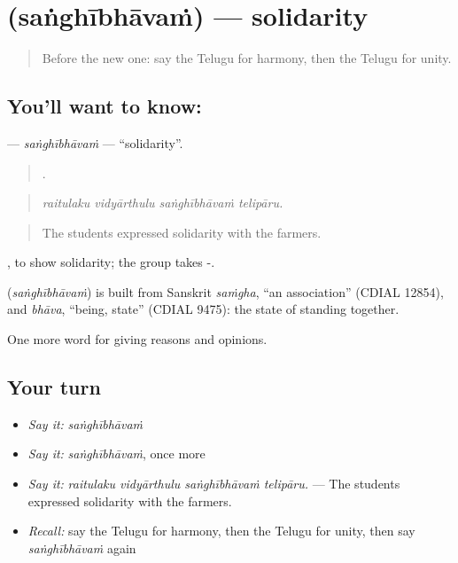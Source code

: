 \section[\texorpdfstring{\te{సంఘీభావం} (saṅghībhāvaṁ)}{సంఘీభావం (saṅghībhāvaṁ)}]{ (saṅghībhāvaṁ) — solidarity}

\label{lesson:TE-C409-sanghibhavam}



\begin{quote}
Before the new one: say the Telugu for harmony, then the Telugu for unity.
\end{quote}

\subsection*{You'll want to know: }
\textbf{} — \emph{saṅghībhāvaṁ} — \textquotedblleft{}solidarity\textquotedblright{}.

\begin{quote}
   .
\end{quote}

\begin{quote}
\emph{raitulaku vidyārthulu saṅghībhāvaṁ telipāru.}
\end{quote}

\begin{quote}
The students expressed solidarity with the farmers.
\end{quote}

 , to show solidarity; the group takes -.

\begin{cousinweb}
\textbf{} (\emph{saṅghībhāvaṁ}) is built from Sanskrit \emph{saṁgha}, \textquotedblleft{}an association\textquotedblright{} (CDIAL 12854), and \emph{bhāva}, \textquotedblleft{}being, state\textquotedblright{} (CDIAL 9475): the state of standing together.
\end{cousinweb}

\begin{grammarlens}[title={What you've built}]
One more word for giving reasons and opinions.
\end{grammarlens}

\subsection*{Your turn}
\begin{itemize}
\raggedright
  \item \emph{Say it:} \emph{saṅghībhāvaṁ}
  \item \emph{Say it:} \emph{saṅghībhāvaṁ}, once more
  \item \emph{Say it:} \emph{raitulaku vidyārthulu saṅghībhāvaṁ telipāru.} — The students expressed solidarity with the farmers.
  \item \emph{Recall:} say the Telugu for harmony, then the Telugu for unity, then say \emph{saṅghībhāvaṁ} again
\end{itemize}

